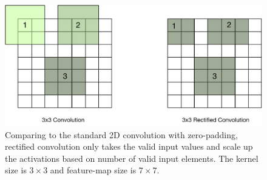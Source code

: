 \begin{figure}[t]
    \centering
    \includegraphics[width=0.9\linewidth]{fig/rectified_conv.pdf}
    \caption{Comparing to the standard 2D convolution with zero-padding, rectified convolution only takes the valid input values and scale up the activations based on number of valid input elements. The kernel size is $3\times 3$ and feature-map size is $7\times 7$. 
    }
    \label{fig:rectified_conv}
\end{figure}